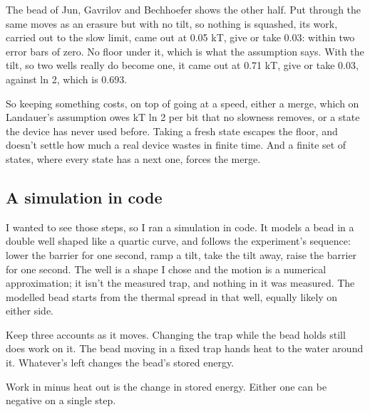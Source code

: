 \documentclass[11pt,twoside]{article}
\theoremstyle{thielethm}
\theoremstyle{thieledef}
\theoremstyle{thieledef}
\theoremstyle{thieledef}
\theoremstyle{thielethm}
\theoremstyle{thieleobs}
\theoremstyle{thielethm}
\begin{document}
The bead of Jun, Gavrilov and Bechhoefer shows the other half. Put through the same moves as an erasure but with no tilt, so nothing is squashed, its work, carried out to the slow limit, came out at 0.05 kT, give or take 0.03: within two error bars of zero. No floor under it, which is what the assumption says. With the tilt, so two wells really do become one, it came out at 0.71 kT, give or take 0.03, against ln 2, which is 0.693.

So keeping something costs, on top of going at a speed, either a merge, which on Landauer's assumption owes kT ln 2 per bit that no slowness removes, or a state the device has never used before. Taking a fresh state escapes the floor, and doesn't settle how much a real device wastes in finite time. And a finite set of states, where every state has a next one, forces the merge.

\subsection{A simulation in code}

I wanted to see those steps, so I ran a simulation in code. It models a bead in a double well shaped like a quartic curve, and follows the experiment's sequence: lower the barrier for one second, ramp a tilt, take the tilt away, raise the barrier for one second. The well is a shape I chose and the motion is a numerical approximation; it isn't the measured trap, and nothing in it was measured. The modelled bead starts from the thermal spread in that well, equally likely on either side.

Keep three accounts as it moves. Changing the trap while the bead holds still does work on it. The bead moving in a fixed trap hands heat to the water around it. Whatever's left changes the bead's stored energy.

\begin{center}

\small Work in minus heat out is the change in stored energy.
Either one can be negative on a single step.
\end{center}
\end{document}
